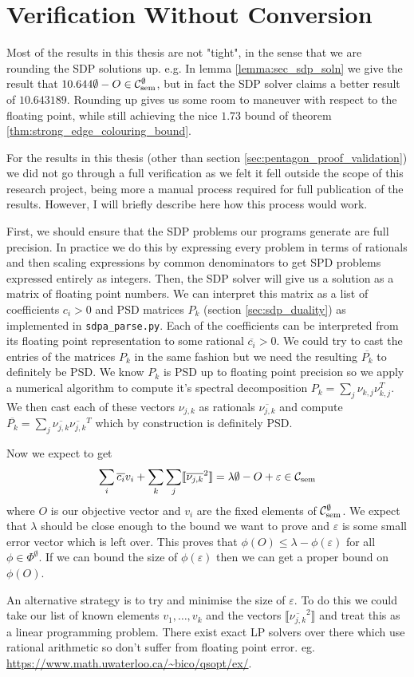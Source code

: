 \section*{Verification Without Conversion}

Most of the results in this thesis are not "tight", in the sense that we are rounding
the SDP solutions up. e.g. In lemma \ref{lemma:sec_sdp_soln} we give the result that
$10.644\emptyset - O \in\mathcal{C}_\mathrm{sem}^\emptyset$, but in fact the SDP solver claims a
better result of $10.643189$. Rounding up gives us some room to maneuver with respect
to the floating point, while still achieving the nice $1.73$ bound of theorem
\ref{thm:strong_edge_colouring_bound}.

For the results in this thesis (other than section \ref{sec:pentagon_proof_validation})
we did not go through a full verification as we felt it
fell outside the scope of this research project, being more a manual process required for
full publication of the results. However, I will briefly describe here how this process
would work.

First, we should ensure that the SDP problems our programs generate are full precision.
In practice we do this by expressing every problem in terms of rationals and then scaling
expressions by common denominators to get SPD problems expressed entirely as integers.
Then, the SDP solver will give us a solution as a matrix of floating point numbers. We
can interpret this matrix as a list of coefficients $c_i > 0$ and PSD matrices $P_k$
(section \ref{sec:sdp_duality}) as implemented in \verb|sdpa_parse.py|. Each of the 
coefficients can be interpreted from its floating point representation to some
rational $\overline{c_i} > 0$. We could try to cast the entries of the matrices $P_k$
in the same fashion but we need the resulting $\overline{P_k}$ to definitely be PSD.
We know $P_k$ is PSD up to floating point precision so we apply a numerical algorithm
to compute it's spectral decomposition $P_k=\sum_j\nu_{k,j}\nu_{k,j}^T$. We then cast
each of these vectors $\nu_{j,k}$ as rationals $\overline{\nu_{j,k}}$ and compute
$\overline{P_k}=\sum_j\overline{\nu_{j,k}}\overline{\nu_{j,k}}^T$ which by construction
is definitely PSD.

Now we expect to get
\[
    \sum_i \overline{c_i} v_i + \sum_k \sum_j \llbracket \overline{\nu_{j,k}}^2 \rrbracket
    = \lambda\emptyset - O + \varepsilon
    \in \mathcal{C}_\mathrm{sem}
\]
where $O$ is our objective vector and $v_i$ are the fixed elements of
$\mathcal{C}_\mathrm{sem}^\emptyset$. We expect that $\lambda$ should be close enough to
the bound we want to prove and $\varepsilon$ is some small error vector which is
left over. This proves that $\phi(O) \leq \lambda - \phi(\varepsilon)$ for all
$\phi\in\Phi^\emptyset$. If we can bound the size of $\phi(\varepsilon)$ then we can
get a proper bound on $\phi(O)$.

An alternative strategy is to try and minimise the size of $\varepsilon$. To do this
we could take our list of known elements $v_1, \dots, v_k$ and the
vectors $\llbracket \overline{\nu_{j,k}}^2\rrbracket$ and treat this as
a linear programming problem. There exist exact LP solvers over there which
use rational arithmetic so don't suffer from floating point error.
eg. \url{https://www.math.uwaterloo.ca/~bico/qsopt/ex/}.

